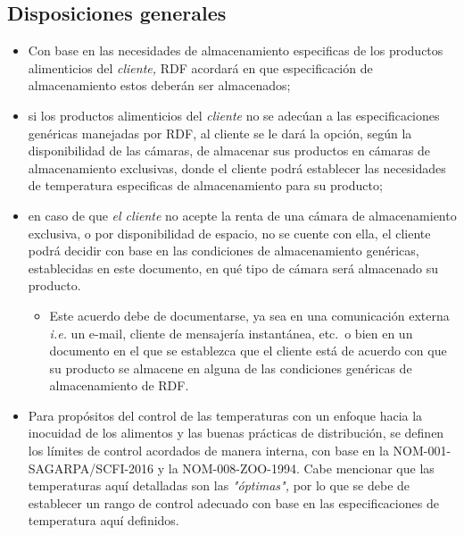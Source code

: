 \begin{description}
\end{description}

\subsection{Disposiciones generales}

\begin{itemize}
	\item Con base en las necesidades de almacenamiento especificas de los productos alimenticios del \emph{cliente,} \gls{RDF} acordará en que especificación de almacenamiento estos deberán ser almacenados;
	\item si los productos alimenticios del \emph{cliente} no se adecúan a las especificaciones genéricas manejadas por \gls{RDF}, al cliente se le dará la opción, según la disponibilidad de las cámaras, de almacenar sus productos en cámaras de almacenamiento exclusivas, donde el cliente podrá establecer las necesidades de temperatura especificas de almacenamiento para su producto;
	\item en caso de que \emph{el cliente} no acepte la renta de una cámara de almacenamiento exclusiva, o por disponibilidad de espacio, no se cuente con ella, el cliente podrá decidir con base en las condiciones de almacenamiento genéricas, establecidas en este documento, en qué tipo de cámara será almacenado su producto.
	\begin{itemize}
		\item Este acuerdo debe de documentarse, ya sea en una comunicación externa \emph{i.e.} un e-mail, cliente de mensajería instantánea, etc.\ o bien en un documento en el que se establezca que el cliente está de acuerdo con que su producto se almacene en alguna de las condiciones genéricas de almacenamiento de \gls{RDF}.
	\end{itemize}
	\item Para propósitos del control de las temperaturas con un enfoque hacia la inocuidad de los alimentos y las buenas prácticas de distribución, se definen los límites de control acordados de manera interna, con base en la NOM-001-SAGARPA/SCFI-2016 y la NOM-008-ZOO-1994. Cabe mencionar que las temperaturas aquí detalladas son las \emph{"óptimas",} por lo que se debe de establecer un rango de control adecuado con base en las especificaciones de temperatura aquí definidos.
\end{itemize}

